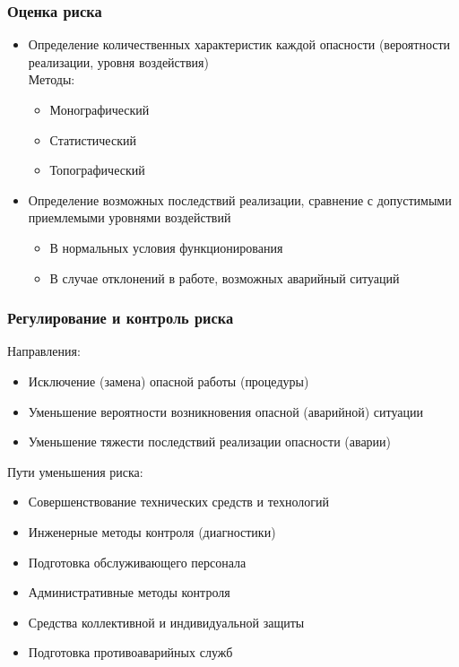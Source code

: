\documentclass[a4paper, 14pt]{extarticle}
\begin{document}
\subsubsection{Оценка риска}
\begin{itemize}
    \item Определение количественных характеристик каждой опасности (вероятности реализации, уровня воздействия)\\
    Методы:
    \begin{itemize}
        \item Монографический
        \item Статистический
        \item Топографический
    \end{itemize}
    \item Определение возможных последствий реализации, сравнение с допустимыми приемлемыми уровнями воздействий
    \begin{itemize}
        \item В нормальных условия функционирования
        \item В случае отклонений в работе, возможных аварийный ситуаций
    \end{itemize}
\end{itemize}

\subsubsection{Регулирование и контроль риска}
Направления:
\begin{itemize}
    \item Исключение (замена) опасной работы (процедуры)
    \item Уменьшение вероятности возникновения опасной (аварийной) ситуации
    \item Уменьшение тяжести последствий реализации опасности (аварии)
\end{itemize}

Пути уменьшения риска:
\begin{itemize}
    \item Совершенствование технических средств и технологий
    \item Инженерные методы контроля (диагностики)
    \item Подготовка обслуживающего персонала
    \item Административные методы контроля
    \item Средства коллективной и индивидуальной защиты
    \item Подготовка противоаварийных служб
\end{itemize}
\end{document}
